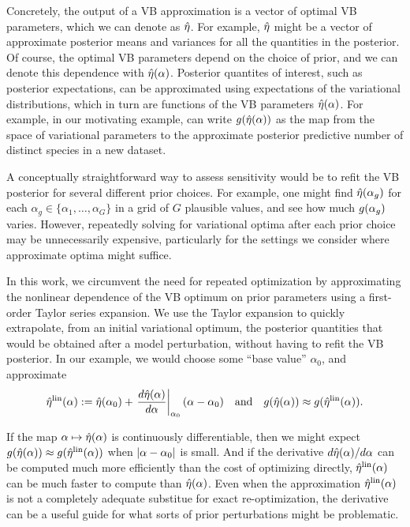 Concretely, the output of a VB approximation is a vector of optimal VB
parameters, which we can denote as $\hat\eta$.  For example, $\hat\eta$ might be a
vector of approximate posterior means and variances for all the quantities in
the posterior.  Of course, the optimal VB parameters depend on the choice of
prior, and we can denote this dependence with $\hat\eta(\alpha)$.  Posterior
quantites of interest, such as posterior expectations, can be approximated using
expectations of the variational distributions, which in turn are functions of
the VB parameters $\hat\eta(\alpha)$. For example, in our motivating example, can
write $g(\hat\eta(\alpha))$ as the map from the space of variational parameters
to the approximate posterior predictive number of distinct species in a new
dataset.

A conceptually straightforward way to assess sensitivity would be to refit the
VB posterior for several different prior choices.  For example, one might find
$\hat\eta(\alpha_g)$ for each $\alpha_g \in \{\alpha_1, \ldots, \alpha_G \}$ in a
grid of $G$ plausible values, and see how much $g(\alpha_g)$ varies. However,
repeatedly solving for variational optima after each prior choice may be
unnecessarily expensive, particularly for the settings we consider where
approximate optima might suffice.

In this work, we circumvent the need for repeated optimization by approximating
the nonlinear dependence of the VB optimum on prior parameters using a
first-order Taylor series expansion. We use the Taylor expansion to quickly
extrapolate, from an initial variational optimum, the posterior quantities that
would be obtained after a model perturbation, without having to refit the VB
posterior.  In our example, we would choose some ``base value'' $\alpha_0$,
and approximate
%
\begin{align*}
%
\etalin(\alpha) :=
    \etaopt(\alpha_0) +
    \fracat{d\etaopt(\alpha)}{d\alpha}{\alpha_0} (\alpha - \alpha_0)
\mathand
g(\etaopt(\alpha)) \approx g(\etalin(\alpha)).
%
\end{align*}

If the map $\alpha \mapsto \hat\eta(\alpha)$ is continuously differentiable, then
we might expect $g(\hat\eta(\alpha)) \approx g(\hat\eta^{\mathrm{lin}}(\alpha))$ when
$\left|\alpha - \alpha_0\right|$ is small.  And if the derivative $d\hat\eta(\alpha) /
d\alpha$ can be computed much more efficiently than the cost of optimizing
directly, $\hat\eta^{\mathrm{lin}}(\alpha)$ can be much faster to compute than
$\hat\eta(\alpha)$.  Even when the approximation $\hat\eta^{\mathrm{lin}}(\alpha)$ is not a
completely adequate substitue for exact re-optimization, the derivative can be a
useful guide for what sorts of prior perturbations might be problematic.

